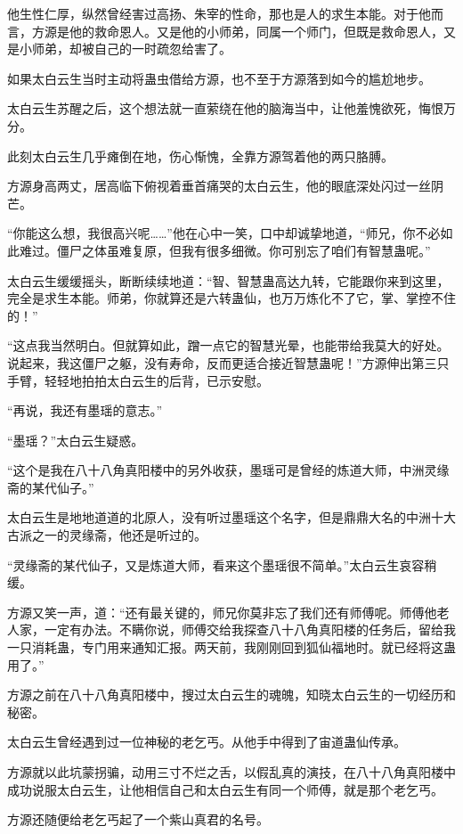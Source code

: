 \begin{this_body}
他生性仁厚，纵然曾经害过高扬、朱宰的性命，那也是人的求生本能。对于他而言，方源是他的救命恩人。又是他的小师弟，同属一个师门，但既是救命恩人，又是小师弟，却被自己的一时疏忽给害了。

如果太白云生当时主动将蛊虫借给方源，也不至于方源落到如今的尴尬地步。

太白云生苏醒之后，这个想法就一直萦绕在他的脑海当中，让他羞愧欲死，悔恨万分。

此刻太白云生几乎瘫倒在地，伤心惭愧，全靠方源驾着他的两只胳膊。

方源身高两丈，居高临下俯视着垂首痛哭的太白云生，他的眼底深处闪过一丝阴芒。

“你能这么想，我很高兴呢……”他在心中一笑，口中却诚挚地道，“师兄，你不必如此难过。僵尸之体虽难复原，但我有很多细微。你可别忘了咱们有智慧蛊呢。”

太白云生缓缓摇头，断断续续地道：“智、智慧蛊高达九转，它能跟你来到这里，完全是求生本能。师弟，你就算还是六转蛊仙，也万万炼化不了它，掌、掌控不住的！”

“这点我当然明白。但就算如此，蹭一点它的智慧光晕，也能带给我莫大的好处。说起来，我这僵尸之躯，没有寿命，反而更适合接近智慧蛊呢！”方源伸出第三只手臂，轻轻地拍拍太白云生的后背，已示安慰。

“再说，我还有墨瑶的意志。”

“墨瑶？”太白云生疑惑。

“这个是我在八十八角真阳楼中的另外收获，墨瑶可是曾经的炼道大师，中洲灵缘斋的某代仙子。”

太白云生是地地道道的北原人，没有听过墨瑶这个名字，但是鼎鼎大名的中洲十大古派之一的灵缘斋，他还是听过的。

“灵缘斋的某代仙子，又是炼道大师，看来这个墨瑶很不简单。”太白云生哀容稍缓。

方源又笑一声，道：“还有最关键的，师兄你莫非忘了我们还有师傅呢。师傅他老人家，一定有办法。不瞒你说，师傅交给我探查八十八角真阳楼的任务后，留给我一只消耗蛊，专门用来通知汇报。两天前，我刚刚回到狐仙福地时。就已经将这蛊用了。”

方源之前在八十八角真阳楼中，搜过太白云生的魂魄，知晓太白云生的一切经历和秘密。

太白云生曾经遇到过一位神秘的老乞丐。从他手中得到了宙道蛊仙传承。

方源就以此坑蒙拐骗，动用三寸不烂之舌，以假乱真的演技，在八十八角真阳楼中成功说服太白云生，让他相信自己和太白云生有同一个师傅，就是那个老乞丐。

方源还随便给老乞丐起了一个紫山真君的名号。


\end{this_body}
